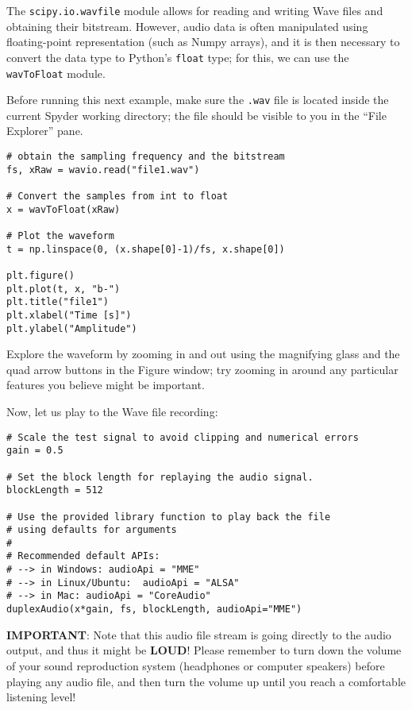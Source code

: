 The {\tt scipy.io.wavfile} module allows for reading and writing Wave files and obtaining their bitstream. However, audio data is often manipulated using floating-point representation (such as Numpy arrays), and it is then necessary to convert the data type to Python's {\tt float} type; for this, we can use the {\tt wavToFloat} module.

Before running this next example, make sure the {\tt .wav} file is located inside the current Spyder working directory; the file should be visible to you in the ``File Explorer'' pane.

\begin{lstlisting}[frame=single]
# obtain the sampling frequency and the bitstream
fs, xRaw = wavio.read("file1.wav")

# Convert the samples from int to float
x = wavToFloat(xRaw)

# Plot the waveform
t = np.linspace(0, (x.shape[0]-1)/fs, x.shape[0])

plt.figure()
plt.plot(t, x, "b-")
plt.title("file1")
plt.xlabel("Time [s]")
plt.ylabel("Amplitude")
\end{lstlisting}

Explore the waveform by zooming in and out using the magnifying glass and the quad arrow buttons in the Figure window; try zooming in around any particular features you believe might be important.

Now, let us play to the Wave file recording:

\begin{lstlisting}[frame=single]
# Scale the test signal to avoid clipping and numerical errors
gain = 0.5

# Set the block length for replaying the audio signal.
blockLength = 512

# Use the provided library function to play back the file
# using defaults for arguments
#
# Recommended default APIs:
# --> in Windows: audioApi = "MME"
# --> in Linux/Ubuntu:  audioApi = "ALSA"
# --> in Mac: audioApi = "CoreAudio"
duplexAudio(x*gain, fs, blockLength, audioApi="MME")
\end{lstlisting}

\textbf{IMPORTANT}: Note that this audio file stream is going directly to the audio output, and thus it might be \textbf{LOUD}! Please remember to turn down the volume of your sound reproduction system (headphones or computer speakers) before playing any audio file, and then turn the volume up until you reach a comfortable listening level!

